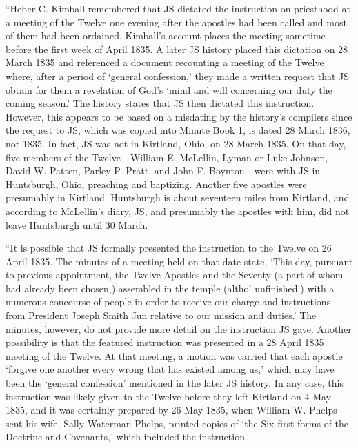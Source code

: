 			``Heber C. Kimball remembered that JS dictated the instruction on priesthood at a meeting of the Twelve one evening after the apostles had been called and most of them had been ordained. Kimball's account places the meeting sometime before the first week of April 1835. A later JS history placed this dictation on 28 March 1835 and referenced a document recounting a meeting of the Twelve where, after a period of `general confession,' they made a written request that JS obtain for them a revelation of God's `mind and will concerning our duty the coming season.' The history states that JS then dictated this instruction. However, this appears to be based on a misdating by the history's compilers since the request to JS, which was copied into Minute Book 1, is dated 28 March 1836, not 1835. In fact, JS was not in Kirtland, Ohio, on 28 March 1835. On that day, five members of the Twelve---William E. McLellin, Lyman or Luke Johnson, David W. Patten, Parley P. Pratt, and John F. Boynton---were with JS in Huntsburgh, Ohio, preaching and baptizing. Another five apostles were presumably in Kirtland. Huntsburgh is about seventeen miles from Kirtland, and according to McLellin's diary, JS, and presumably the apostles with him, did not leave Huntsburgh until 30 March.
			
			``It is possible that JS formally presented the instruction to the Twelve on 26 April 1835. The minutes of a meeting held on that date state, `This day, pursuant to previous appointment, the Twelve Apostles and the Seventy (a part of whom had already been chosen,) assembled in the temple (altho' unfinished.) with a numerous concourse of people in order to receive our charge and instructions from President Joseph Smith Jun relative to our mission and duties.' The minutes, however, do not provide more detail on the instruction JS gave. Another possibility is that the featured instruction was presented in a 28 April 1835 meeting of the Twelve. At that meeting, a motion was carried that each apostle `forgive one another every wrong that has existed among us,' which may have been the `general confession' mentioned in the later JS history. In any case, this instruction was likely given to the Twelve before they left Kirtland on 4 May 1835, and it was certainly prepared by 26 May 1835, when William W. Phelps sent his wife, Sally Waterman Phelps, printed copies of `the Six first forms of the Doctrine and Covenants,' which included the instruction.
			
